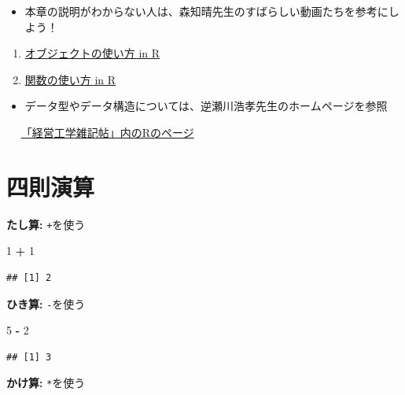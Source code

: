 \documentclass[
]{book}
\newenvironment{Shaded}{\begin{snugshade}}{\end{snugshade}}
\newcommand{\DecValTok}[1]{\textcolor[rgb]{0.00,0.00,0.81}{#1}}
\newcommand{\SpecialCharTok}[1]{\textcolor[rgb]{0.81,0.36,0.00}{\textbf{#1}}}
\providecommand{\tightlist}{%
  \setlength{\itemsep}{0pt}\setlength{\parskip}{0pt}}
\begin{document}
\begin{itemize}
\tightlist
\item
  本章の説明がわからない人は、森知晴先生のすばらしい動画たちを参考にしよう！
\end{itemize}

\begin{enumerate}
\def\labelenumi{\arabic{enumi}.}
\tightlist
\item
  \href{https://youtu.be/CblsIBlzqX0}{オブジェクトの使い方 in R}\\
\item
  \href{https://youtu.be/q8MI6P2hoUM}{関数の使い方 in R}
\end{enumerate}

\begin{itemize}
\tightlist
\item
  データ型やデータ構造については、逆瀬川浩孝先生のホームページを参照
\end{itemize}

　 \href{http://www.f.waseda.jp/sakas/R/index.html}{「経営工学雑記帖」内のRのページ}

\hypertarget{ux56dbux5247ux6f14ux7b97}{%
\section{四則演算}\label{ux56dbux5247ux6f14ux7b97}}

\textbf{たし算:} \texttt{+}を使う

\begin{Shaded}
\begin{Highlighting}[]
\DecValTok{1} \SpecialCharTok{+} \DecValTok{1}
\end{Highlighting}
\end{Shaded}

\begin{verbatim}
## [1] 2
\end{verbatim}

\textbf{ひき算:} \texttt{-}を使う

\begin{Shaded}
\begin{Highlighting}[]
\DecValTok{5} \SpecialCharTok{{-}} \DecValTok{2}
\end{Highlighting}
\end{Shaded}

\begin{verbatim}
## [1] 3
\end{verbatim}

\textbf{かけ算:} \texttt{*}を使う
\end{document}
